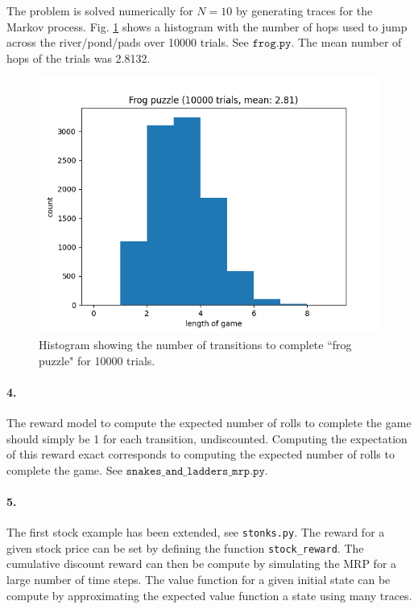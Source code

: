 \documentclass[12pt]{article}
\begin{document}
The problem is solved numerically for $N = 10$ by generating traces for the Markov process. Fig. \ref{frog_puzzle} shows a histogram with the number of hops used to jump across the river/pond/pads over 10000 trials. See $\texttt{frog.py}$. The mean number of hops of the trials was 2.8132.
\begin{figure}
	\centering
	\includegraphics[width=.5\textwidth]{frog_puzzle_histogram.png}
	\caption{Histogram showing the number of transitions to complete ``frog puzzle" for 10000 trials.}
	\label{frog_puzzle}
\end{figure}

\paragraph{4.}
The reward model to compute the expected number of rolls to complete the game should simply be 1 for each transition, undiscounted. Computing the expectation of this reward exact corresponds to computing the expected number of rolls to complete the game. See $\texttt{snakes\_and\_ladders\_mrp.py}$.

\paragraph{5.}
The first stock example has been extended, see \texttt{stonks.py}. The reward for a given stock price can be set by defining the function \texttt{stock_reward}. The cumulative discount reward can then be compute by simulating the MRP for a large number of time steps. The value function for a given initial state can be compute by approximating the expected value function a state using many traces.
\end{document}
